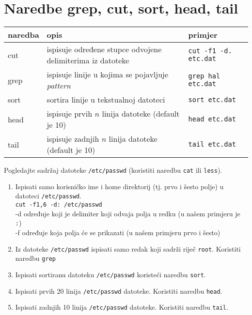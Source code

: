 \section{Naredbe grep, cut, sort, head, tail}
\begin{tabularx}{\textwidth}{lXl} 
\hline 
naredba & opis & primjer\\
\hline
cut & ispisuje određene stupce odvojene delimiterima iz datoteke &\lstinline!cut -f1 -d. etc.dat!\\
grep & ispisuje linije u kojima se pojavljuje \textit{pattern} & \lstinline!grep hal etc.dat!\\
sort & sortira linije u tekstualnoj datoteci & \lstinline!sort etc.dat!\\
head & ispisuje prvih $n$ linija datoteke (default je 10) & \lstinline!head etc.dat!\\
tail & ispisuje zadnjih $n$ linija datoteke (default je 10) & \lstinline!tail etc.dat!
\\ \hline
\end{tabularx}
\begin{zadatak} Pogledajte sadržaj datoteke \texttt{/etc/passwd} (koristiti naredbu \texttt{cat} ili \texttt{less}).


\begin{enumerate}

\item Ispisati samo korisničko ime i home direktorij (tj. prvo i šesto polje) u datoteci \texttt{/etc/passwd}.\\
 \lstinline!cut -f1,6 -d: /etc/passwd!\\
-d određuje koji je delimiter koji odvaja polja u redku (u našem primjeru je \lstinline!:!)\\
-f određuje koja polja će se prikazati (u našem primjeru prvo i šesto)
\item Iz datoteke \texttt{/etc/passwd} ispisati samo redak koji sadrži riječ \texttt{root}. Koristiti naredbu \texttt{grep}
\item Ispisati sortiranu datoteku \texttt{/etc/passwd} koristeći naredbu \texttt{sort}.
\item Ispisati prvih 20 linija \texttt{/etc/passwd} datoteke. Koristiti naredbu \texttt{head}.
\item Ispisati zadnjih 10 linija \texttt{/etc/passwd} datoteke. Koristiti naredbu \texttt{tail}.

\end{enumerate}
\end{zadatak}

